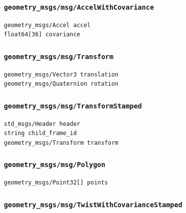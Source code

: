 \documentclass[
]{article}
\begin{document}
\subsubsection{\texorpdfstring{\texttt{geometry\_msgs/msg/AccelWithCovariance}}{geometry\_msgs/msg/AccelWithCovariance}}\label{geometry_msgsmsgaccelwithcovariance}

\begin{verbatim}
geometry_msgs/Accel accel
float64[36] covariance
\end{verbatim}

\subsubsection{\texorpdfstring{\texttt{geometry\_msgs/msg/Transform}}{geometry\_msgs/msg/Transform}}\label{geometry_msgsmsgtransform}

\begin{verbatim}
geometry_msgs/Vector3 translation
geometry_msgs/Quaternion rotation
\end{verbatim}

\subsubsection{\texorpdfstring{\texttt{geometry\_msgs/msg/TransformStamped}}{geometry\_msgs/msg/TransformStamped}}\label{geometry_msgsmsgtransformstamped}

\begin{verbatim}
std_msgs/Header header
string child_frame_id
geometry_msgs/Transform transform
\end{verbatim}

\subsubsection{\texorpdfstring{\texttt{geometry\_msgs/msg/Polygon}}{geometry\_msgs/msg/Polygon}}\label{geometry_msgsmsgpolygon}

\begin{verbatim}
geometry_msgs/Point32[] points
\end{verbatim}

\subsubsection{\texorpdfstring{\texttt{geometry\_msgs/msg/TwistWithCovarianceStamped}}{geometry\_msgs/msg/TwistWithCovarianceStamped}}\label{geometry_msgsmsgtwistwithcovariancestamped}
\end{document}
